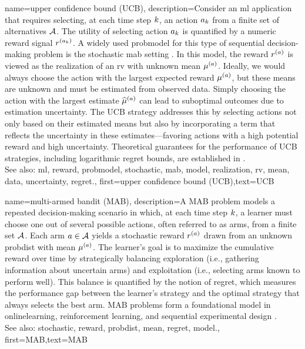 {name={upper confidence bound (UCB)},
	description={Consider an \gls{ml} 
		application that requires selecting, at each time step $k$, an action $a_{k}$ 
		from a finite set of alternatives $\mathcal{A}$. The utility of selecting action $a_{k}$ 
		is quantified by a numeric \gls{reward} signal $r^{(a_{k})}$. 
		A widely used \gls{probmodel} for this type of sequential decision-making problem 
		is the \gls{stochastic} \gls{mab} setting \cite{Bubeck2012}. In this \gls{model}, 
		the \gls{reward} $r^{(a)}$ is viewed as the \gls{realization} of an \gls{rv} 
		with unknown \gls{mean} $\mu^{(a)}$. Ideally, we would always choose the 
		action with the largest expected \gls{reward} $\mu^{(a)}$, but these 
		\glspl{mean} are unknown and must be estimated from observed \gls{data}. Simply 
		choosing the action with the largest estimate $\widehat{\mu}^{(a)}$ can 
		lead to suboptimal outcomes due to estimation \gls{uncertainty}. The UCB strategy 
		addresses this by selecting actions not only based on their estimated \glspl{mean} but 
		also by incorporating a term that reflects the \gls{uncertainty} in these estimates—favoring 
		actions with a high potential \gls{reward} and high \gls{uncertainty}. Theoretical guarantees 
		for the performance of UCB strategies, including logarithmic \gls{regret} bounds, are established in \cite{Bubeck2012}.
					\\ 
		See also: \gls{ml}, \gls{reward}, \gls{probmodel}, \gls{stochastic}, \gls{mab}, \gls{model}, \gls{realization}, \gls{rv}, \gls{mean}, \gls{data}, \gls{uncertainty}, \gls{regret}.},
	first={upper confidence bound (UCB)},text={UCB} 
}

{name={multi-armed bandit (MAB)},
	description={A MAB problem models 
		a repeated decision-making scenario in which, at each time step $k$, a learner must 
		choose one out of several possible actions, often referred to as arms, from a finite 
		set $\mathcal{A}$. Each arm $a \in \mathcal{A}$ yields a \gls{stochastic} \gls{reward} $r^{(a)}$ 
		drawn from an unknown \gls{probdist} with \gls{mean} $\mu^{(a)}$. 
		The learner’s goal is to maximize the cumulative \gls{reward} over time by 
		strategically balancing exploration (i.e., gathering information about 
		uncertain arms) and exploitation (i.e., selecting arms known to perform well). 
		This balance is quantified by the notion of \gls{regret}, which measures the performance 
		gap between the learner's strategy and the optimal strategy that always selects the best arm. 
		MAB problems form a foundational \gls{model} in \gls{onlinelearning}, reinforcement learning, 
		and sequential experimental design \cite{Bubeck2012}.
					\\ 
		See also: \gls{stochastic}, \gls{reward}, \gls{probdist}, \gls{mean}, \gls{regret}, \gls{model}.},
	first={MAB},text={MAB}
}



